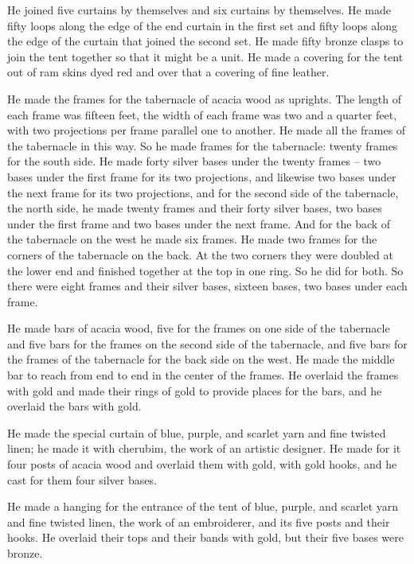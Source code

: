 {He joined
five
curtains
by themselves
and six
curtains
by themselves.
He made
fifty
loops
along
the edge
of the end
curtain
in the first set
and fifty
loops
along
the edge
of the curtain
that joined
the second set.
He made
fifty
bronze
clasps
to join
the tent
together so that it might be
a unit.
He made
a covering
for the tent
out of ram
skins
dyed red
and over
that a covering
of fine
leather.
\par }{\PP {}He made
the frames
for the tabernacle
of acacia
wood
as uprights.
The length
of each frame
was fifteen feet,
the width
of each
frame
was two and a quarter feet,
with two
projections
per frame
parallel
one
to
another. He made
all
the frames
of the tabernacle
in this way.
So he made
frames
for the tabernacle: twenty
frames
for the south
side.
He made
forty
silver
bases
under
the twenty
frames
– two
bases
under
the first
frame
for its two
projections,
and likewise two
bases
under
the next
frame
for its two
projections,
and for the second
side
of the tabernacle,
the north
side,
he made
twenty
frames
and their forty
silver
bases,
two
bases
under
the first frame
and two
bases
under
the next frame.
And for the back
of the tabernacle
on the west
he made
six
frames.
He made
two
frames
for the corners
of the tabernacle
on the back.
At the two
corners
they were
doubled
at the lower
end and finished together
at
the top
in
one
ring.
So
he did
for both.
So there were
eight
frames
and their silver
bases,
sixteen
bases,
two
bases
under
each
frame.
\par }{\PP {}He made
bars
of acacia
wood,
five
for the frames
on one
side
of the tabernacle
and five
bars
for the frames
on the second
side
of the tabernacle,
and five
bars
for the frames
of the tabernacle
for the back
side on the west.
He made
the middle
bar
to reach
from
end
to
end
in
the center
of the frames.
He overlaid
the frames
with gold
and made
their rings
of gold
to provide
places for the bars,
and he overlaid
the bars
with gold.
\par }{\PP {}He made
the special curtain
of blue,
purple,
and scarlet
yarn
and fine
twisted
linen;
he made
it with cherubim,
the work
of an artistic designer.
He made
for it four
posts
of acacia wood
and overlaid
them with gold,
with gold
hooks,
and he cast
for them four
silver
bases.
\par }{\PP {}He made
a hanging
for the entrance
of the tent
of blue,
purple,
and scarlet
yarn
and fine
twisted
linen,
the work
of an embroiderer,
and its five
posts
and their hooks.
He overlaid
their tops
and their bands
with gold,
but their five
bases
were bronze.

}
